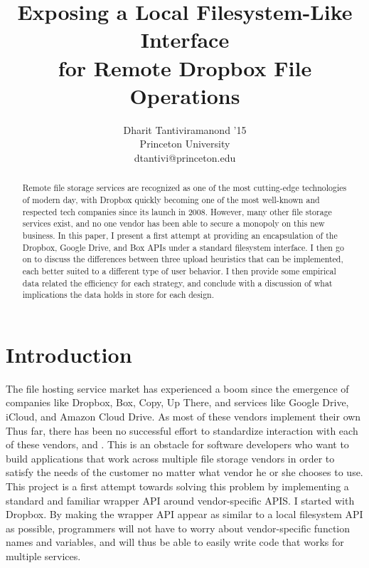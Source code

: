 \documentclass[pageno]{jpaper}
\begin{document}
\title{Exposing a Local Filesystem-Like Interface \\ for Remote Dropbox File Operations}
\author{Dharit Tantiviramanond '15\\ Princeton University \\ dtantivi@princeton.edu}

\date{}
\maketitle

\doublespace

\thispagestyle{empty}

\begin{abstract}
Remote file storage services are recognized as one of the most cutting-edge technologies of modern day, with Dropbox quickly becoming one of the most well-known and respected tech companies since its launch in 2008. However, many other file storage services exist, and no one vendor has been able to secure a monopoly on this new business. In this paper, I present a first attempt at providing an encapsulation of the Dropbox, Google Drive, and Box APIs under a standard filesystem interface. I then go on to discuss the differences between three upload heuristics that can be implemented, each better suited to a different type of user behavior. I then provide some empirical data related the efficiency for each strategy, and conclude with a discussion of what implications the data holds in store for each design.
\end{abstract}

\section{Introduction}
\label{sec:intro}
The file hosting service market has experienced a boom since the emergence of companies like Dropbox, Box, Copy, Up There, and services like Google Drive, iCloud, and Amazon Cloud Drive. As most of these vendors implement their own Thus far, there has been no successful effort to standardize interaction with each of these vendors, and . This is an obstacle for software developers who want to build applications that work across multiple file storage vendors in order to satisfy the needs of the customer no matter what vendor he or she chooses to use. This project is a first attempt towards solving this problem by implementing a standard and familiar wrapper API around vendor-specific APIS. I started with Dropbox. By making the wrapper API appear as similar to a local filesystem API as possible, programmers will not have to worry about vendor-specific function names and variables, and will thus be able to easily write code that works for multiple services.
\end{document}
